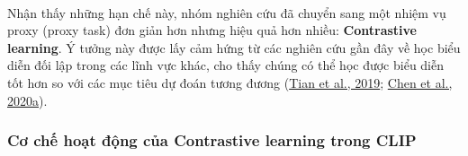\paragraph{}{Nhận thấy những hạn chế này, nhóm nghiên cứu đã chuyển sang một nhiệm vụ proxy (proxy task) đơn giản hơn nhưng hiệu quả hơn nhiều: \textbf{Contrastive learning}. Ý tưởng này được lấy cảm hứng từ các nghiên cứu gần đây về học biểu diễn đối lập trong các lĩnh vực khác, cho thấy chúng có thể học được biểu diễn tốt hơn so với các mục tiêu dự đoán tương đương (\hyperref[tian]{Tian et al., 2019}; \hyperref[chen]{Chen et al., 2020a}).}

\subsubsection{Cơ chế hoạt động của Contrastive learning trong CLIP}

